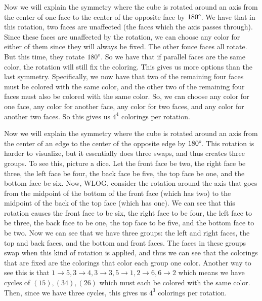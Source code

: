 \documentclass{article}
\begin{document}
Now we will explain the symmetry where the cube is rotated around an axis from
the center of one face to the center of the opposite face by $180 \degree$.
We have that in this rotation, two faces are unaffected (the faces which the
axis passes through). Since these faces are unaffected by the rotation,
we can choose any color for either of them since they will always be fixed.
The other fouce faces all rotate. But this time, they rotate $180 \degree$.
So we have that if parallel faces are the same color, the rotation will still
fix the coloring. This gives us more options than the last symmetry. Specifically,
we now have that two of the remaining four faces must be colored with the same
color, and the other two of the remaining four faces must also be colored with
the same color. So, we can choose any color for one face, any color for another
face, any color for two faces, and any color for another two faces. So this gives
us $4^4$ colorings per rotation.

Now we will explain the symmetry where the cube is rotated around an axis from
the center of an edge to the center of the opposite edge by $180 \degree$.
This rotation is harder to visualize, but it essentially does three swaps,
and thus creates three groups. To see this, picture a dice. Let the front face
be two, the right face be three, the left face be four, the back face be five,
the top face be one, and the bottom face be six. Now, WLOG, consider the rotation
around the axis that goes from the midpoint of the bottom of the front face
(which has two) to the midpoint of the back of the top face (which has one). We can
see that this rotation causes the front face to be six, the right face to
be four, the left face to be three, the back face to be one, the top face to be
five, and the bottom face to be two. Now we can see that we have three groups:
the left and right faces, the top and back faces, and the bottom and front faces.
The faces in these groups swap when this kind of rotation is applied,
and thus we can see that the colorings that are fixed are the colorings that
color each group one color. Another way to see this is that
$1 \rightarrow 5, 3 \rightarrow 4, 3 \rightarrow 3, 5 \rightarrow 1, 2 \rightarrow
6, 6 \rightarrow 2$ which means we have cycles of $(15),(34),(26)$ which must
each be colored with the same color.
Then, since we have three cycles, this gives us $4^3$ colorings per rotation.
\end{document}
